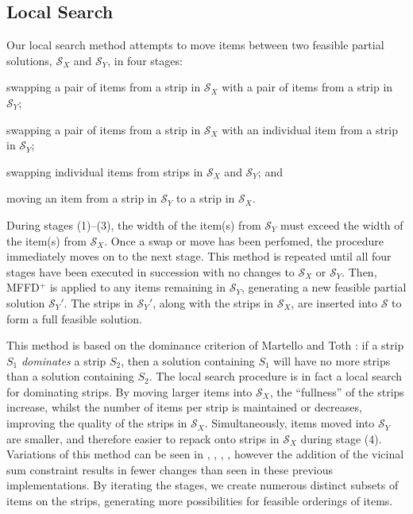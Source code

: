 \documentclass{elsarticle}
\begin{document}
\subsection{Local Search}
\label{sub:localsearch}
Our local search method attempts to move items between two feasible partial solutions, $\mathcal{S}_X$ and $\mathcal{S}_Y$, in four stages: 
\begin{enumerate*}[label={(\arabic*)}]
	\item swapping a pair of items from a strip in $\mathcal{S}_X$ with a pair of items from a strip in $\mathcal{S}_Y$;
	\item swapping a pair of items from a strip in $\mathcal{S}_X$ with an individual item from a strip in $\mathcal{S}_Y$;
	\item swapping individual items from strips in $\mathcal{S}_X$ and $\mathcal{S}_Y$; and
	\item moving an item from a strip in $\mathcal{S}_Y$ to a strip in $\mathcal{S}_X$.
\end{enumerate*} 
During stages (1)--(3), the width of the item(s) from $\mathcal{S}_Y$ must exceed the width of the item(s) from $\mathcal{S}_X$. Once a swap or move has been perfomed, the procedure immediately moves on to the next stage. This method is repeated until all four stages have been executed in succession with no changes to $\mathcal{S}_X$ or $\mathcal{S}_Y$. Then, MFFD$^+$ is applied to any items remaining in $\mathcal{S}_Y$, generating a new feasible partial solution $\mathcal{S}_Y'$. The strips in $\mathcal{S}_Y'$, along with the strips in $\mathcal{S}_X$, are inserted into $\mathcal{S}$ to form a full feasible solution.

This method is based on the dominance criterion of Martello and Toth \cite{martello1990l}: if a strip $S_1$ \emph{dominates} a strip $S_2$, then a solution containing $S_1$ will have no more strips than a solution containing $S_2$. The local search procedure is in fact a local search for dominating strips. By moving larger items into $\mathcal{S}_X$, the ``fullness'' of the strips increase, whilst the number of items per strip is maintained or decreases, improving the quality of the strips in $\mathcal{S}_X$. Simultaneously, items moved into $\mathcal{S}_Y$ are smaller, and therefore easier to repack onto strips in $\mathcal{S}_X$ during stage (4). Variations of this method can be seen in \cite{falkenauer1996}, \cite{levine2004}, \cite{lewis2009}, \cite{lewis2017}, however the addition of the vicinal sum constraint results in fewer changes than seen in these previous implementations. By iterating the stages, we create numerous distinct subsets of items on the strips, generating more possibilities for feasible orderings of items.
\end{document}
